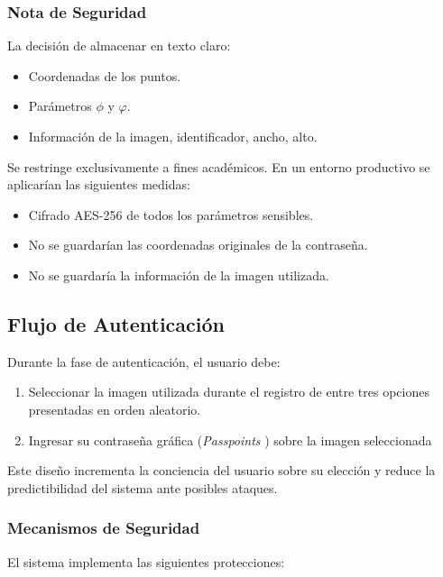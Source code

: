 \subsubsection{Nota de Seguridad}
La decisión de almacenar en texto claro:
\begin{itemize}
	\item Coordenadas de los puntos.
	\item Parámetros $\phi$ y $\varphi$.
	\item Informaci\'on de la imagen, identificador, ancho, alto.
\end{itemize}

Se restringe exclusivamente a fines académicos. En un entorno productivo se aplicarían las siguientes medidas:
\begin{itemize}
	\item Cifrado AES-256 de todos los parámetros sensibles.
	\item No se guardar\'ian las coordenadas originales de la contrase\~na.
	\item No se guardar\'ia la informaci\'on de la imagen utilizada.
\end{itemize}

\subsection{Flujo de Autenticación}
Durante la fase de autenticación, el usuario debe:

\begin{enumerate}
	\item Seleccionar la imagen utilizada durante el registro de entre tres opciones presentadas en orden aleatorio.
	\item Ingresar su contraseña gráfica (\textit{Passpoints
}) sobre la imagen seleccionada
\end{enumerate}

Este diseño incrementa la conciencia del usuario sobre su elección y reduce la predictibilidad del sistema ante posibles ataques.

\subsubsection{Mecanismos de Seguridad}
El sistema implementa las siguientes protecciones:

